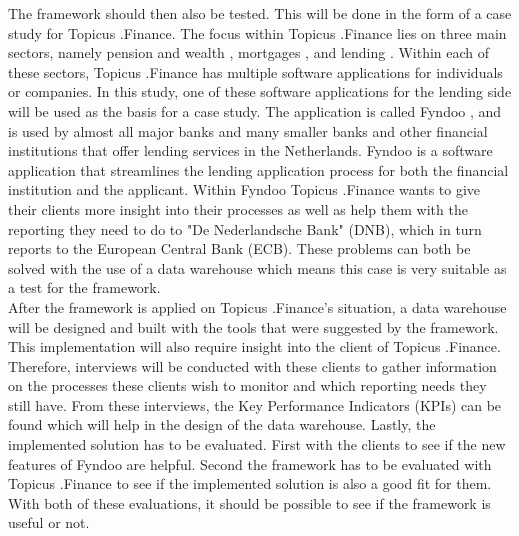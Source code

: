 \documentclass[11pt]{article}
\begin{document}
The framework should then also be tested. This will be done in the form of a case study for Topicus .Finance. The focus within Topicus .Finance lies on three main sectors, namely pension and wealth \cite{pension},  mortgages \cite{mortgages}, and lending \cite{businesslending}. Within each of these sectors, Topicus .Finance has multiple software applications for individuals or companies. In this study, one of these software applications for the lending side will be used as the basis for a case study. The application is called Fyndoo \cite{fyndoo}, and is used by almost all major banks and many smaller banks and other financial institutions that offer lending services in the Netherlands. Fyndoo is a software application that streamlines the lending application process for both the financial institution and the applicant. Within Fyndoo Topicus .Finance wants to give their clients more insight into their processes as well as help them with the reporting they need to do to "De Nederlandsche Bank" (DNB), which in turn reports to the European Central Bank (ECB). These problems can both be solved with the use of a data warehouse which means this case is very suitable as a test for the framework. \\

After the framework is applied on Topicus .Finance's situation, a data warehouse will be designed and built with the tools that were suggested by the framework. This implementation will also require insight into the client of Topicus .Finance. Therefore, interviews will be conducted with these clients to gather information on the processes these clients wish to monitor and which reporting needs they still have. From these interviews, the Key Performance Indicators (KPIs) can be found which will help in the design of the data warehouse. Lastly, the implemented solution has to be evaluated. First with the clients to see if the new features of Fyndoo are helpful. Second the framework has to be evaluated with Topicus .Finance to see if the implemented solution is also a good fit for them. With both of these evaluations, it should be possible to see if the framework is useful or not.
\end{document}
